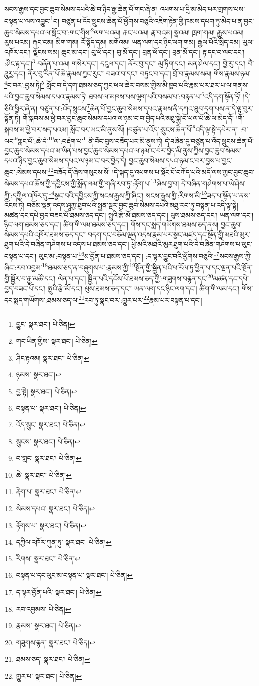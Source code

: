སངས་རྒྱས་དང་བྱང་ཆུབ་སེམས་དཔའི་ཆེ་བ་ཉིད་རྒྱ་ཆེན་པོ་གང་ཞེ་ན། འཕགས་པ་དྲི་མ་མེད་པར་གྲགས་པས་བསྟན་པ་ལས་འབྱུང་\footnote{བྱུང་  སྣར་ཐང་།  པེ་ཅིན། }བ། བཙུན་པ་འོད་སྲུངས་ཆེན་པོ་ཕྱོགས་བཅུའི་འཇིག་རྟེན་གྱི་ཁམས་དཔག་ཏུ་མེད་པ་ན་བྱང་ཆུབ་སེམས་དཔའ་ལ་སློང་བ་:གང་གིས་\footnote{གང་ཡིན་གྱིས་  སྣར་ཐང་།  པེ་ཅིན། }ལག་པའམ། རྐང་པའམ། རྣ་བའམ། སྣའམ། ཁྲག་གམ། རྒྱུས་པའམ། རུས་པའམ། རྐང་ངམ། མིག་གམ། རོ་སྟོད་དམ། མགོའམ། ཡན་ལག་དང་ཉིང་ལག་གམ། རྒྱལ་པོའི་སྲིད་དམ། ཡུལ་འཁོར་དང་། ལྗོངས་སམ། ཆུང་མ་དང་། བུ་ཕོ་དང་། བུ་མོ་དང་། བྲན་ཕོ་དང་། བྲན་མོ་དང་། རྟ་དང་བ་ལང་དང་། :ཤིང་རྟ་དང་།\footnote{ཤིང་རྟའམ།  སྣར་ཐང་།  པེ་ཅིན། } བཞོན་པ་འམ། གསེར་དང་། དངུལ་དང་། ནོར་བུ་དང་། མུ་ཏིག་དང་། མན་ཤེལ་དང་། བྱེ་རུ་དང་། བཻ་ཌཱུརྱ་དང་། ནོར་བུ་རིན་པོ་ཆེ་རྣམས་ཀྱང་རུང་། བཟའ་བ་དང་། བཏུང་བ་དང་། བྲོ་བ་རྣམས་སམ། གོས་རྣམས་ཉམ་\footnote{ཉམས་  སྣར་ཐང་། }ང་བར་:བྱས་ཏེ།\footnote{བྱ་སྟེ།  སྣར་ཐང་།  པེ་ཅིན། } སློང་བ་དེ་དག་ཐམས་ཅད་ཀྱང་ཕལ་ཆེར་བསམ་གྱིས་མི་ཁྱབ་པའི་རྣམ་པར་ཐར་པ་ལ་གནས་པའི་བྱང་ཆུབ་སེམས་དཔའ་རྣམས་ཏེ། ཐབས་ལ་མཁས་པས་ལྷག་པའི་བསམ་པ་:བརྟན་པ་\footnote{བསྟན་པ་  སྣར་ཐང་།  པེ་ཅིན། }འདི་དག་སྟོན་ཏོ། །དེ་ཅིའི་ཕྱིར་ཞེ་ན། བཙུན་པ་:འོད་སྲུངས་\footnote{འོད་སྲུང་  སྣར་ཐང་།  པེ་ཅིན། }ཆེན་པོ་བྱང་ཆུབ་སེམས་དཔའ་རྣམས་ནི་དཀའ་ཐུབ་དྲག་པས་ན་དེ་ལྟ་བུར་སྟོན་ཏེ། གོ་སྐབས་མ་ཕྱེ་བར་བྱང་ཆུབ་སེམས་དཔའ་ལ་ཉམ་ང་བ་བྱེད་པའི་མཐུ་སྐྱེ་བོ་ཕལ་པོ་ཆེ་ལ་མེད་དོ། །གོ་སྐབས་མ་ཕྱེ་བར་སད་པའམ། སློང་བར་ཡང་མི་ནུས་སོ། །བཙུན་པ་འོད་:སྲུངས་ཆེན་པོ་\footnote{སྲུངས་  སྣར་ཐང་།  པེ་ཅིན། }འདི་ལྟ་སྟེ་དཔེར་ན། :བ་ལང་\footnote{བ་གླང་  སྣར་ཐང་།  པེ་ཅིན། }གླང་པོ་:ཆེ་དེ་\footnote{ཆེ་  སྣར་ཐང་།  པེ་ཅིན། }ལ་:བརྡེག་པ་\footnote{རྡེག་པ་  སྣར་ཐང་།  པེ་ཅིན། }ནི་བོང་བུས་བཟོད་པར་མི་ནུས་ཏེ། དེ་བཞིན་དུ་བཙུན་པ་འོད་སྲུངས་ཆེན་པོ་བྱང་ཆུབ་སེམས་དཔའ་མ་ཡིན་པས་བྱང་ཆུབ་སེམས་དཔའ་ལ་ཉམ་ང་བར་བྱེད་མི་ནུས་ཀྱིས་བྱང་ཆུབ་སེམས་དཔའ་ཉིད་བྱང་ཆུབ་སེམས་དཔའ་ལ་ཉམ་ང་བར་བྱེད་དེ། བྱང་ཆུབ་སེམས་དཔའ་ཉམ་ང་བར་བྱས་པ་བྱང་ཆུབ་:སེམས་དཔས་\footnote{སེམས་དཔའ་  སྣར་ཐང་།  པེ་ཅིན། }བཟོད་དོ་ཞེས་གསུངས་སོ། །དེ་སྐད་དུ་འཕགས་པ་སྡོང་པོ་བཀོད་པའི་མདོ་ལས་ཀྱང་བྱང་ཆུབ་སེམས་དཔའ་ཆོས་ཀྱི་དབྱིངས་ཀྱི་སྨོན་ལམ་གྱི་གཞི་རབ་ཏུ་:རྟོག་པ་\footnote{རྟོགས་པ་  སྣར་ཐང་།  པེ་ཅིན། }ཞེས་བྱ་བ། དེ་བཞིན་གཤེགས་པ་ཡེ་ཤེས་ཀྱི་:དཀྱིལ་འཁོར་དུ་\footnote{དཀྱིལ་འཁོར་ཀུན་ཏུ་  སྣར་ཐང་།  པེ་ཅིན། }སྣང་བའི་དབྱིངས་ཀྱི་སངས་རྒྱས་ཀྱི་ཞིང་། སངས་རྒྱས་ཀྱི་:རིགས་མི་\footnote{རིགས་  སྣར་ཐང་།  པེ་ཅིན། }ཟད་པ་སྟོན་པ་ནས་འོངས་ཏེ། བཅོམ་ལྡན་འདས་ཤཱཀྱ་ཐུབ་པའི་སྤྱན་སྔར་བྱང་ཆུབ་སེམས་དཔའི་མཐུ་རབ་ཏུ་བསྟན་པ་འདི་ལྟ་སྟེ། མཚན་དང་དཔེ་བྱད་བཟང་པོ་ཐམས་ཅད་དང་། སྤུའི་རྩེ་མོ་ཐམས་ཅད་དང་། ལུས་ཐམས་ཅད་དང་། ཡན་ལག་དང་། ཉིང་ལག་ཐམས་ཅད་དང་། ཚིག་གི་ལམ་ཐམས་ཅད་དང་། གོས་དང་སྨད་གཡོགས་ཐམས་ཅད་ནས། བྱང་ཆུབ་སེམས་དཔའི་འཁོར་ཐམས་ཅད་དང་། བདག་དང་བཅོམ་ལྡན་འདས་རྣམ་པར་སྣང་མཛད་དང་སྔོན་གྱི་མཐའི་མུར་ཐུག་པའི་དེ་བཞིན་གཤེགས་པ་འདས་པ་ཐམས་ཅད་དང་། ཕྱི་མའི་མཐའི་མུར་ཐུག་པའི་དེ་བཞིན་གཤེགས་པ་ལུང་བསྟན་པ་དང་། ལུང་མ་:བསྟན་པ་\footnote{བསྟན་པ་དང་ལུང་མ་བསྟན་པ་  སྣར་ཐང་།  པེ་ཅིན། }མ་བྱོན་པ་ཐམས་ཅད་དང་། :ད་ལྟར་བྱུང་བའི་ཕྱོགས་བཅུའི་\footnote{ད་ལྟར་བྱོན་པའི་  སྣར་ཐང་།  པེ་ཅིན། }སངས་རྒྱས་ཀྱི་ཞིང་:རབ་འབྱམ་\footnote{རབ་འབྱམས་  པེ་ཅིན། }ཐམས་ཅད་ན་བཞུགས་པ་:རྣམས་ཀྱི་\footnote{རྣམས་  སྣར་ཐང་།  པེ་ཅིན། }སྔོན་གྱི་སྦྱིན་པའི་ཕ་རོལ་ཏུ་ཕྱིན་པ་དང་ལྡན་པའི་སྔོན་གྱི་སྦྱོར་བ་རྒྱ་མཚོ་དང་། ལེན་པ་དང་། སྦྱིན་པའི་དངོས་པོ་ཐམས་ཅད་ཀྱི་:གཟུགས་བརྙན་དང་\footnote{གཟུགས་རྙན་  སྣར་ཐང་།  པེ་ཅིན། }མཚན་དང་དཔེ་བྱད་བཟང་པོ་དང་། སྤུའི་རྩེ་མོ་དང་། ལུས་ཐམས་ཅད་དང་། ཡན་ལག་དང་ཉིང་ལག་དང་། ཚིག་གི་ལམ་དང་། གོས་དང་སྨད་གཡོགས་:ཐམས་ཅད་ལ་\footnote{ཐམས་ཅད་  སྣར་ཐང་།  པེ་ཅིན། }རབ་ཏུ་སྣང་བར་:གྱུར་པར་\footnote{གྱུར་པ་  སྣར་ཐང་།  པེ་ཅིན། }རྣམ་པར་བསྟན་པ་དང་། 